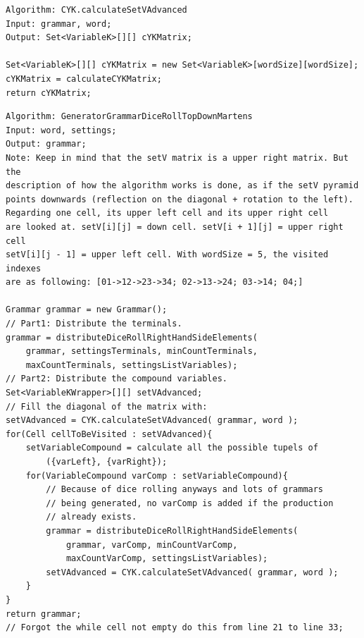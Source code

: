 \lstset{language=java}
\begin{lstlisting}[frame=htrbl, caption={CYK.calculateSetVAdvanced}, 
label={lst:CYK.calculateSetVAdvanced}]
Algorithm: CYK.calculateSetVAdvanced
Input: grammar, word;
Output: Set<VariableK>[][] cYKMatrix;

Set<VariableK>[][] cYKMatrix = new Set<VariableK>[wordSize][wordSize];
cYKMatrix = calculateCYKMatrix;
return cYKMatrix;
\end{lstlisting}

\pagebreak

\lstset{language=java}
\begin{lstlisting}[frame=htrbl,caption={GeneratorGrammarDiceRollTopDownMartens}, 
label={lst:GeneratorGrammarDiceRollTopDownMartens}]
Algorithm: GeneratorGrammarDiceRollTopDownMartens
Input: word, settings;
Output: grammar;
Note: Keep in mind that the setV matrix is a upper right matrix. But the
description of how the algorithm works is done, as if the setV pyramid 
points downwards (reflection on the diagonal + rotation to the left).
Regarding one cell, its upper left cell and its upper right cell 
are looked at. setV[i][j] = down cell. setV[i + 1][j] = upper right cell
setV[i][j - 1] = upper left cell. With wordSize = 5, the visited indexes 
are as following: [01->12->23->34; 02->13->24; 03->14; 04;]

Grammar grammar = new Grammar();
// Part1: Distribute the terminals.
grammar = distributeDiceRollRightHandSideElements(
	grammar, settingsTerminals, minCountTerminals, 
	maxCountTerminals, settingsListVariables);
// Part2: Distribute the compound variables.
Set<VariableKWrapper>[][] setVAdvanced;
// Fill the diagonal of the matrix with:
setVAdvanced = CYK.calculateSetVAdvanced( grammar, word );
for(Cell cellToBeVisited : setVAdvanced){
	setVariableCompound = calculate all the possible tupels of 
		({varLeft}, {varRight});
	for(VariableCompound varComp : setVariableCompound){
		// Because of dice rolling anyways and lots of grammars 
		// being generated, no varComp is added if the production
		// already exists.
		grammar = distributeDiceRollRightHandSideElements(
			grammar, varComp, minCountVarComp, 
			maxCountVarComp, settingsListVariables);
		setVAdvanced = CYK.calculateSetVAdvanced( grammar, word );
	}
}
return grammar;
// Forgot the while cell not empty do this from line 21 to line 33;
\end{lstlisting}

\pagebreak

